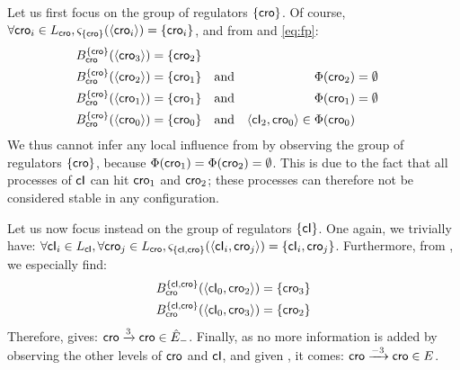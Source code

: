 Let us first focus on the group of regulators $\{ \mathsf{cro} \}$.
Of course, $\forall \mathsf{cro}_i \in L_{\mathsf{cro}}, \varsigma_{\{ \mathsf{cro} \}}(\mbox{$\langle \mathsf{cro}_i \rangle$}) = \{ \mathsf{cro}_i \}$,
and from  and \eqref{eq:fp}:
\begin{align*}
  B_{\mathsf{cro}}^{\{ \mathsf{cro} \}}(\mbox{$\langle \mathsf{cro}_3 \rangle$}) &= \{ \mathsf{cro}_2 \} && \\
  B_{\mathsf{cro}}^{\{ \mathsf{cro} \}}(\mbox{$\langle \mathsf{cro}_2 \rangle$}) &= \{ \mathsf{cro}_1 \} && \text{and} &
    \Phi&(\mathsf{cro}_2) = \emptyset \\
  B_{\mathsf{cro}}^{\{ \mathsf{cro} \}}(\mbox{$\langle \mathsf{cro}_1 \rangle$}) &= \{ \mathsf{cro}_1 \} && \text{and} &
    \Phi&(\mathsf{cro}_1) = \emptyset \\
  B_{\mathsf{cro}}^{\{ \mathsf{cro} \}}(\mbox{$\langle \mathsf{cro}_0 \rangle$}) &= \{ \mathsf{cro}_0 \} && \text{and} &
    \mbox{$\langle \mathsf{cI}_2, \mathsf{cro}_0 \rangle$} \in \Phi&(\mathsf{cro}_0)
\end{align*}
We thus cannot infer any local influence from 
by observing the group of regulators $\{ \mathsf{cro} \}$,
because $\Phi(\mathsf{cro}_1) = \Phi(\mathsf{cro}_2) = \emptyset$.
This is due to the fact that all processes of $\mathsf{cI}$ can hit $\mathsf{cro}_1$ and $\mathsf{cro}_2$;
these processes can therefore not be considered stable in any configuration.

Let us now focus instead on the group of regulators $\{ \mathsf{cI} \}$.
One again, we trivially have:
$\forall \mathsf{cI}_i \in L_{\mathsf{cI}}, \forall \mathsf{cro}_j \in L_{\mathsf{cro}},
  \varsigma_{\{ \mathsf{cI}, \mathsf{cro} \}}(\mbox{$\langle \mathsf{cI}_i, \mathsf{cro}_j \rangle$}) = \{ \mathsf{cI}_i, \mathsf{cro}_j \}$.
Furthermore, from , we especially find:
\begin{align*}
  B_{\mathsf{cro}}^{\{ \mathsf{cI}, \mathsf{cro} \}}(\mbox{$\langle \mathsf{cI}_0, \mathsf{cro}_2 \rangle$}) &= \{ \mathsf{cro}_3 \} \\
  B_{\mathsf{cro}}^{\{ \mathsf{cI}, \mathsf{cro} \}}(\mbox{$\langle \mathsf{cI}_0, \mathsf{cro}_3 \rangle$}) &= \{ \mathsf{cro}_2 \}
\end{align*}
Therefore,  gives: $\mathsf{cro} \xrightarrow{3} \mathsf{cro} \in \hat{E}_-$.
Finally, as no more information is added by observing the other levels of $\mathsf{cro}$ and $\mathsf{cI}$,
and given , it comes: $\mathsf{cro} \xrightarrow{- 3} \mathsf{cro} \in E$.



